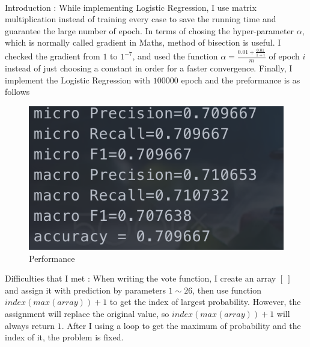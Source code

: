 

    \begin{solution}
        \

        Introduction : While implementing Logistic Regression, I use matrix multiplication instead of training every case to save the running time and guarantee the large number of epoch. In terms of chosing the hyper-parameter $\alpha$, which is normally called gradient in Maths, method of bisection is useful. I checked the gradient from $1$ to $1^{-7}$, and used the function $\alpha=\frac{0.01+\frac{0.01}{1+i}}{m}$ of epoch $i$ instead of just choosing a constant in order for a faster convergence. Finally, I implement the Logistic Regression with $100000$ epoch and the preformance is as follows
        \begin{figure}[H]
            \centering
            \includegraphics[width=0.5\linewidth]{1.png}
            \caption{Performance}
            \label{fig:mcmthesis-logo}
        \end{figure}

        Difficulties that I met : When writing the vote function, I create an array $[\ ]$ and assign it with prediction by parameters $1\sim 26$, then use function $index(max(array))+1$ to get the index of largest probability. However, the assignment will replace the original value, so $index(max(array))+1$ will always return $1$. After I using a loop to get the maximum of probability and the index of it, the problem is fixed.

    \end{solution}




